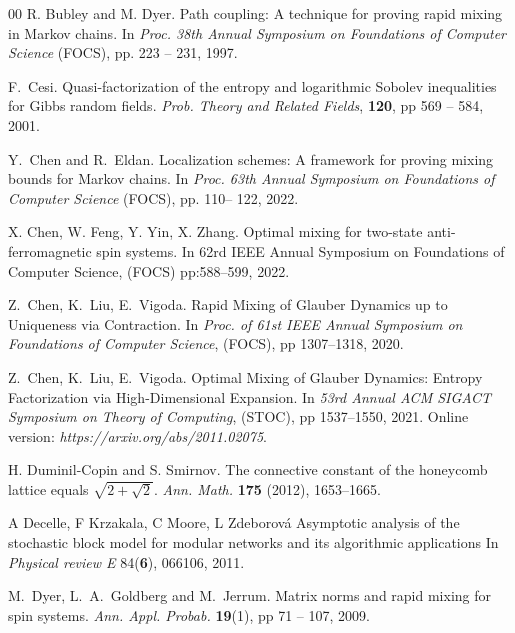 \documentclass[11pt,reqno]{amsart}
\numberwithin{equation}{section}
\begin{document}
\begin{thebibliography}{00}
R. Bubley and M. Dyer. Path coupling: A technique for proving rapid mixing in Markov chains.
In {\em Proc. 38th Annual Symposium on Foundations of Computer Science} (FOCS), pp. 223 -- 231, 1997.


F.~Cesi. Quasi-factorization of the entropy and logarithmic Sobolev inequalities for
Gibbs random fields. {\em Prob. Theory and Related Fields},  {\bf 120}, pp 569 -- 584,  2001.

Y.~Chen and R.~Eldan. Localization schemes: A framework for proving mixing bounds for Markov chains.
In {\em Proc. 63th Annual Symposium on Foundations of Computer Science} (FOCS), pp. 110-- 122, 2022. 







X. Chen, W. Feng, Y. Yin, X. Zhang.
Optimal mixing for two-state anti-ferromagnetic spin systems. 
In 62rd {IEEE} Annual Symposium on Foundations of Computer Science, (FOCS) pp:588--599, 2022.






Z.~Chen, K.~Liu, E.~Vigoda. Rapid Mixing of Glauber Dynamics up to Uniqueness via Contraction. 
In {\em Proc. of 61st {IEEE} Annual Symposium on Foundations of Computer Science}, (FOCS),
pp 1307--1318, 2020.



Z.~Chen, K.~Liu, E.~Vigoda. 
Optimal Mixing of Glauber Dynamics: Entropy Factorization via High-Dimensional Expansion.
In {\em 53rd Annual {ACM} {SIGACT} Symposium on Theory of Computing}, (STOC),
pp 1537--1550, 2021. Online version: {\em https://arxiv.org/abs/2011.02075}.

H. Duminil-Copin and S. Smirnov. The connective constant of the honeycomb lattice equals 
$\sqrt{2+\sqrt{2}}$. {\em Ann. Math.} {\bf 175} (2012), 1653--1665.




A Decelle, F Krzakala, C Moore, L Zdeborová
Asymptotic analysis of the stochastic block model for modular networks and its algorithmic applications
In {\em Physical review E} 84({\bf 6}), 066106, 2011. 




M.~Dyer, L.~A.~Goldberg and M.~Jerrum. Matrix norms and rapid mixing for spin systems.
{\em Ann. Appl. Probab.} {\bf 19}(1), pp 71 -- 107, 2009. 





\end{thebibliography}
\end{document}

